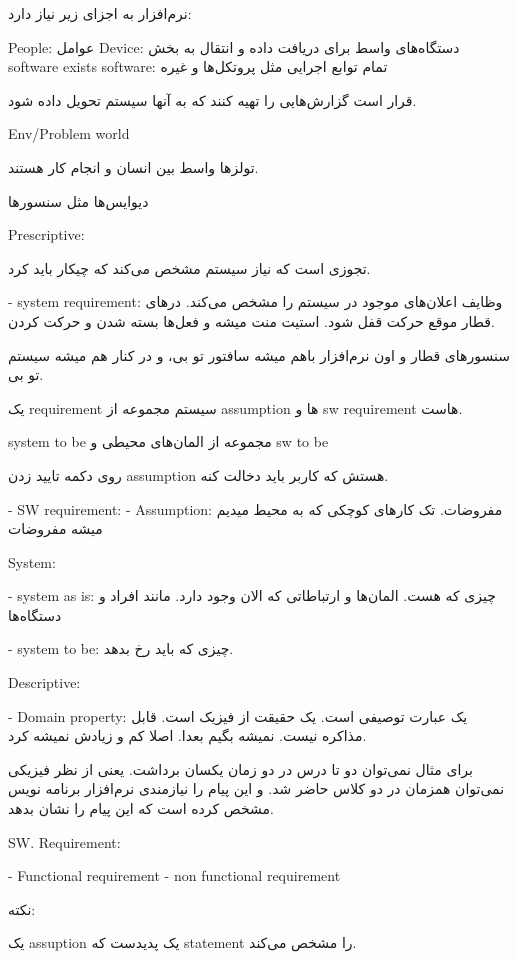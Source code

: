 نرم‌افزار به اجزای زیر نیاز دارد:

People: عوامل
Device: دستگاه‌های واسط برای دریافت داده و انتقال به بخش software
exists software: تمام توابع اجرایی مثل پروتکل‌ها و غیره

قرار است گزارش‌هایی را تهیه کنند که به آنها سیستم تحویل داده شود.

Env/Problem world

تولز‌ها واسط بین انسان و انجام کار هستند.

دیوایس‌ها مثل سنسور‌ها

Prescriptive:

تجوزی است که نیاز سیستم مشخص می‌کند که چیکار باید کرد.

- system requirement: وظایف اعلان‌های موجود در سیستم را مشخص می‌کند.  در‌های
قطار موقع حرکت قفل شود. استیت منت میشه و فعل‌ها بسته شدن و حرکت کردن.

سنسور‌های قطار و اون نرم‌افزار باهم میشه سافتور تو بی، و در کنار هم میشه سیستم
تو بی.

یک requirement سیستم مجموعه‌ از assumption ها و sw requirement هاست.

system to be مجموعه از المان‌های‌ محیطی و sw to be

روی دکمه تایید زدن assumption هستش که کاربر باید دخالت کنه.

- SW requirement: 
- Assumption: مفروضات. تک کار‌های کوچکی که به محیط میدیم میشه مفروضات

System:

- system as is: چیزی که هست. المان‌ها و ارتباطاتی که الان وجود دارد.
مانند افراد و دستگاه‌ها

- system to be: چیزی که باید رخ بدهد.

Descriptive:

- Domain property: یک عبارت توصیفی است. یک حقیقت از فیزیک است. قابل مذاکره نیست.
نمیشه بگیم بعدا. اصلا کم و زیادش نمیشه کرد.

برای مثال نمی‌توان دو تا درس در دو زمان یکسان برداشت. یعنی از نظر فیزیکی
نمی‌توان همزمان در دو کلاس حاضر شد. و این پیام را نیازمندی نرم‌افزار برنامه نویس
مشخص کرده است که این پیام را نشان بدهد.

SW. Requirement:

- Functional requirement
- non functional requirement

نکته:

یک assuption یک پدیدست که statement را مشخص می‌کند.